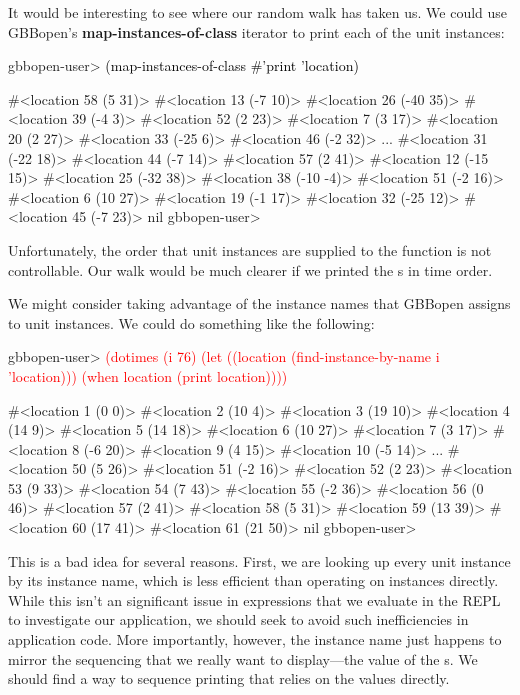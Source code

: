 \documentclass[10pt,twoside,english,pdftex]{article}
\begin{document}
%
%
It would be interesting to see where our random walk has taken us.  We could
use GBBopen's \textbf{map-instances-of-class} iterator to print each of the
 unit instances:
%
\W\supp
\begin{example}
\textcolor{darkergray}{%
  gbbopen-user> \textcolor{black}{(map-instances-of-class #'print 'location)}

  #<location 58 (5 31)> 
  #<location 13 (-7 10)> 
  #<location 26 (-40 35)> 
  #<location 39 (-4 3)> 
  #<location 52 (2 23)> 
  #<location 7 (3 17)> 
  #<location 20 (2 27)> 
  #<location 33 (-25 6)> 
  #<location 46 (-2 32)> 
       ...
  #<location 31 (-22 18)> 
  #<location 44 (-7 14)> 
  #<location 57 (2 41)> 
  #<location 12 (-15 15)> 
  #<location 25 (-32 38)> 
  #<location 38 (-10 -4)> 
  #<location 51 (-2 16)> 
  #<location 6 (10 27)> 
  #<location 19 (-1 17)> 
  #<location 32 (-25 12)> 
  #<location 45 (-7 23)> 
  nil
  gbbopen-user>}
\end{example}
%
Unfortunately, the order that unit instances are supplied to the 
function is not controllable.  Our walk would be much clearer if we printed
the s in time order.

%
%
We might consider taking advantage of the instance names that GBBopen assigns
to unit instances.  We could do something like the following:
%
\W\supp
\begin{example}
\textcolor{darkergray}{%
  gbbopen-user> \textcolor{red}{(dotimes (i 76)
                  (let ((location (find-instance-by-name i 'location)))
                    (when location
                       (print location))))}

  #<location 1 (0 0)> 
  #<location 2 (10 4)> 
  #<location 3 (19 10)> 
  #<location 4 (14 9)> 
  #<location 5 (14 18)> 
  #<location 6 (10 27)> 
  #<location 7 (3 17)> 
  #<location 8 (-6 20)> 
  #<location 9 (4 15)> 
  #<location 10 (-5 14)> 
       ...
  #<location 50 (5 26)> 
  #<location 51 (-2 16)> 
  #<location 52 (2 23)> 
  #<location 53 (9 33)> 
  #<location 54 (7 43)> 
  #<location 55 (-2 36)> 
  #<location 56 (0 46)> 
  #<location 57 (2 41)> 
  #<location 58 (5 31)> 
  #<location 59 (13 39)> 
  #<location 60 (17 41)> 
  #<location 61 (21 50)> 
  nil
  gbbopen-user>}
\end{example}

This is a bad idea for several reasons.  First, we are looking up every
 unit instance by its instance name, which is less efficient
than operating on  instances directly.  While this isn't an
significant issue in expressions that we evaluate in the REPL to investigate
our application, we should seek to avoid such inefficiencies in application
code.  More importantly, however, the  instance name just
happens to mirror the sequencing that we really want to display---the
 value of the s.  We should find a way to sequence
 printing that relies on the  values directly.
\end{document}
